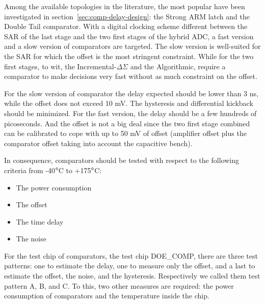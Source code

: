 Among the available topologies in the literature, the most popular have been investigated in section~\ref{sec:comp-delay-design}: the Strong ARM latch and the Double Tail comparator. With a digital clocking scheme different between the SAR of the last stage and the two first stages of the hybrid ADC, a fast version and a slow version of comparators are targeted. The slow version is well-suited for the SAR for which the offset is the most stringent constraint. While for the two first stages, to wit, the Incremental-\(\Delta \Sigma\) and the Algorithmic, require a comparator to make decisions very fast without as much constraint on the offset.

For the slow version of comparator the delay expected should be lower than 3 ns, while the offset does not exceed 10 mV. The hysteresis and differential kickback should be minimized. For the fast version, the delay should be a few hundreds of picoseconds. And the offset is not a big deal since the two first stage combined can be calibrated to cope with up to 50 mV of offset (amplifier offset plus the comparator offset taking into account the capacitive bench).

In consequence, comparators should be tested with respect to the following criteria from -40\(\degree\)C to +175\(\degree\)C\@:
\begin{itemize}
\item The power consumption
\item The offset
\item The time delay
\item The noise
\end{itemize}

For the test chip of comparators, the test chip DOE\_COMP, there are three test patterns: one to estimate the delay, one to measure only the offset, and a last to estimate the offset, the noise, and the hysteresis. Respectively we called them test pattern A, B, and C. To this, two other measures are required: the power consumption of comparators and the temperature inside the chip. 


